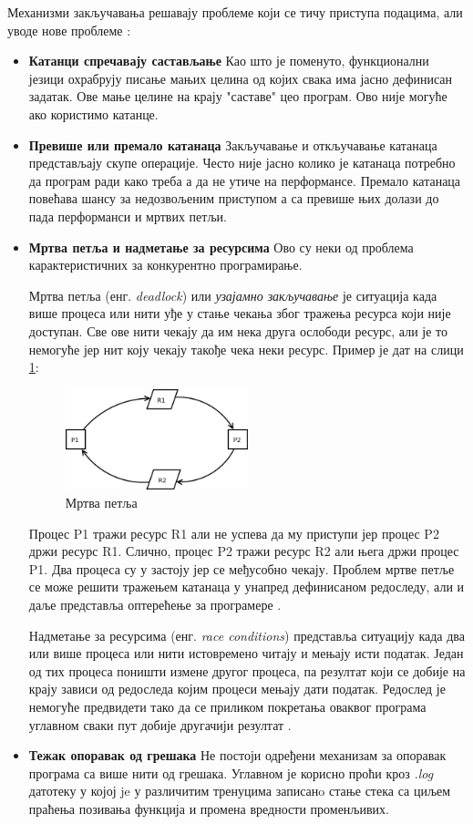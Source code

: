 \documentclass[12pt,oneside]{memoir}
\begin{document}
Механизми закључавања решавају проблеме који се тичу приступа подацима, али уводе нове проблеме \cite{progInScala3}:
\begin{itemize}
\item \textbf{Катанци спречавају састављање} Као што је поменуто, функционални језици охрабрују писање мањих целина од којих свака има јасно дефинисан задатак. Ове мање целине на крају "саставе" цео програм. Ово није могуће ако користимо катанце.
\item \textbf{Превише или премало катанаца} Закључавање и откључавање катанаца представљају скупе операције. Често није јасно колико је катанаца потребно да програм ради како треба а да не утиче на перформансе. Премало катанаца повећава шансу за недозвољеним приступом а са превише њих долази до пада перформанси и мртвих петљи.
\item \textbf{Мртва петља и надметање за ресурсима} Ово су неки од проблема карактеристичних за конкурентно програмирање.

Мртва петља (енг. \textit{deadlock}) или \textit{узајамно закључавање} је ситуација када више процеса или нити уђе у стање чекања због тражења ресурса који није доступан. Све ове нити чекају да им нека друга ослободи ресурс, али је то немогуће јер нит коју чекају такође чека неки ресурс. Пример је дат на слици \ref{fig:deadlock}:
\begin{figure}[!ht]
  \centering
  \includegraphics[width=0.5\textwidth]{deadlock.png}
  \caption{Мртва петља}
  \label{fig:deadlock}
\end{figure}
Процес P1 тражи ресурс R1 али не успева да му приступи јер процес P2 држи ресурс R1. Слично, процес P2 тражи ресурс R2 али њега држи процес P1. Два процеса су у застоју јер се међусобно чекају. Проблем мртве петље се може решити тражењем катанаца у унапред дефинисаном редоследу, али и даље представља оптерећење за програмере \cite{microsoftRaceC}.

\label{raceCon}
Надметање за ресурсима (енг. \textit{race conditions}) представља ситуацију када два или више процеса или нити истовремено читају и мењају исти податак. Један од тих процеса поништи измене другог процеса, па резултат који се добије на крају зависи од редоследа којим процеси мењају дати податак. Редослед је немогуће предвидети тако да се приликом покретања оваквог програма углавном сваки пут добије другачији резултат \cite{microsoftRaceC}.

\item \textbf{Тежак опоравак од грешака} Не постоји одређени механизам за опоравак програма са више нити од грешака. Углавном је корисно проћи кроз \textit{.log} датотеку у којој je у различитим тренуцима записанo стање стека са циљем праћења позивања функција и промена вредности променљивих.
\end{itemize}
\end{document}
